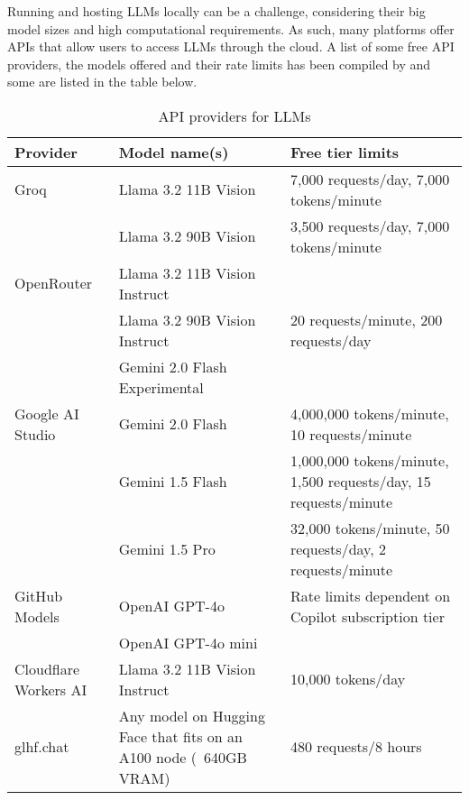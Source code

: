Running and hosting LLMs locally can be a challenge, considering their big model sizes and high computational requirements. As such, many platforms offer APIs that allow users to access LLMs through the cloud. A list of some free API providers, the models offered and their rate limits has been compiled by \textcite{llmapi} and some are listed in the table below.

\begin{table}[h!]
    \centering
    \begin{tabular}{p{2cm} p{5cm} p{6cm}}
        \toprule
        \textbf{Provider} & \textbf{Model name(s)} & \textbf{Free tier limits} \\
        \midrule
        \raggedright
        Groq & Llama 3.2 11B Vision & 7,000 requests/day, 7,000 tokens/minute \\
        & Llama 3.2 90B Vision & 3,500 requests/day, 7,000 tokens/minute \\
        \hline
        \raggedright
        OpenRouter & Llama 3.2 11B Vision Instruct &  \\
        & Llama 3.2 90B Vision Instruct & 20 requests/minute, 200 requests/day \\
        & Gemini 2.0 Flash Experimental &  \\
        \hline
        \raggedright
        Google AI Studio & Gemini 2.0 Flash & 4,000,000 tokens/minute, 10 requests/minute \\
        & Gemini 1.5 Flash & 1,000,000 tokens/minute, 1,500 requests/day, 15 requests/minute \\
        & Gemini 1.5 Pro & 32,000 tokens/minute, 50 requests/day, 2 requests/minute \\
        \hline
        \raggedright
        GitHub Models & OpenAI GPT-4o & Rate limits dependent on Copilot subscription tier \\
        & OpenAI GPT-4o mini & \\
        \hline
        \raggedright
        Cloudflare Workers AI & Llama 3.2 11B Vision Instruct & 10,000 tokens/day \\
        \hline
        \raggedright
        glhf.chat & Any model on Hugging Face that fits on an A100 node (~640GB VRAM)& 480 requests/8 hours \\
        \bottomrule
    \end{tabular}
    \caption{API providers for LLMs}
    \label{tab:llm_apis}
\end{table}

\FloatBarrier
\clearpage


